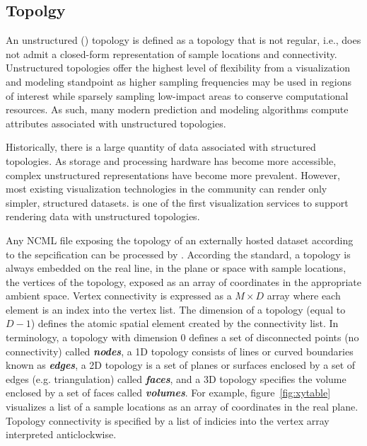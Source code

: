 \subsection{\ugrid{} Topolgy}
An unstructured (\ugrid{}) topology is defined as a topology that is
not regular, i.e., does not admit a closed-form representation of
sample locations and connectivity. Unstructured topologies offer the
highest level of flexibility from a visualization and modeling
standpoint as higher sampling frequencies may be used in regions of
interest while sparsely sampling low-impact areas to conserve
computational resources. As such, many modern \cf{} prediction and
modeling algorithms compute attributes associated with unstructured
topologies.

Historically, there is a large quantity of \cf{} data associated with
structured topologies. As storage and processing hardware has become
more accessible, complex unstructured representations have become more
prevalent. However, most existing visualization technologies in the
\cf{} community can render only simpler, structured
datasets. \sciwms{} is one of the first visualization services to
support rendering data with unstructured topologies.

Any NCML file exposing the topology of an externally hosted
dataset according to the \cfugrid{} sepcification can be processed by
\sciwms{}. According the \cfugrid{} standard, a topology is always
embedded on the real line, in the plane or space with sample
locations, the vertices of the topology, exposed as an array of
coordinates in the appropriate ambient space. Vertex connectivity is
expressed as a $M \times D$ array where each element is an index into
the vertex list. The dimension of a topology (equal to $D - 1$) defines the
atomic spatial element created by the connectivity list. In \cfugrid{}
terminology, a topology with dimension 0 defines a set of disconnected
points (no connectivity) called \textbf{\textit{nodes}}, a 1D topology
consists of lines or curved boundaries known as
\textbf{\textit{edges}}, a 2D topology is a set of planes or surfaces
enclosed by a set of edges (e.g. triangulation) called
\textbf{\textit{faces}}, and a 3D topology specifies the volume enclosed
by a set of faces called \textbf{\textit{volumes}}.
For example, figure~\ref{fig:xytable} visualizes a list of a sample
locations as an array of coordinates in the real plane. Topology
connectivity is specified by a list of indicies into the vertex array
interpreted anticlockwise. 

